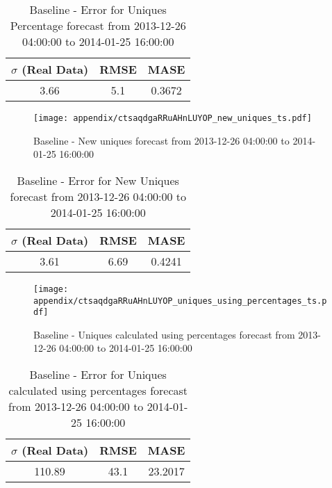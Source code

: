 \begin{table}[H]
\centering
\footnotesize
\begin{tabular}{ccc}
$\sigma$ (Real Data) & RMSE & MASE   \\ \hline
3.66 & 5.1 & 0.3672 \\
\end{tabular}

\vspace{0.5cm}

\caption{
Baseline - Error for Uniques Percentage forecast from 2013-12-26 04:00:00 to 2014-01-25 16:00:00}
\end{table}

\begin{figure}[H] \begin{center} \leavevmode
\texttt{[image: appendix/ctsaqdgaRRuAHnLUYOP\_new\_uniques\_ts.pdf]} \caption{
Baseline - New uniques forecast from 2013-12-26 04:00:00 to 2014-01-25 16:00:00} \label{fig:appendix/ctsaqdgaRRuAHnLUYOP_new_uniques_ts.pdf} \end{center}
\end{figure}

\begin{table}[H]
\centering
\footnotesize
\begin{tabular}{ccc}
$\sigma$ (Real Data) & RMSE & MASE   \\ \hline
3.61 & 6.69 & 0.4241 \\
\end{tabular}

\vspace{0.5cm}

\caption{
Baseline - Error for New Uniques forecast from 2013-12-26 04:00:00 to 2014-01-25 16:00:00}
\end{table}

\begin{figure}[H] \begin{center} \leavevmode
\texttt{[image: appendix/ctsaqdgaRRuAHnLUYOP\_uniques\_using\_percentages\_ts.pdf]} \caption{
Baseline - Uniques calculated using percentages forecast from 2013-12-26 04:00:00 to 2014-01-25 16:00:00} \label{fig:appendix/ctsaqdgaRRuAHnLUYOP_uniques_using_percentages_ts.pdf} \end{center}
\end{figure}

\begin{table}[H]
\centering
\footnotesize
\begin{tabular}{ccc}
$\sigma$ (Real Data) & RMSE & MASE   \\ \hline
110.89 & 43.1 & 23.2017 \\
\end{tabular}

\vspace{0.5cm}

\caption{
Baseline - Error for Uniques calculated using percentages forecast from 2013-12-26 04:00:00 to 2014-01-25 16:00:00}
\end{table}


